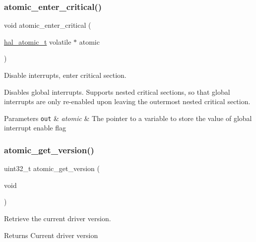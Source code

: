 \subsubsection{\texorpdfstring{atomic\+\_\+enter\+\_\+critical()}{atomic\_enter\_critical()}}
{\footnotesize\ttfamily void atomic\+\_\+enter\+\_\+critical (\begin{DoxyParamCaption}\item[{\hyperlink{group__doc__driver__hal__helper__atomic_ga6b3a0c9eea25111ac1877e0302e2fe1c}{hal\+\_\+atomic\+\_\+t} volatile $\ast$}]{atomic }\end{DoxyParamCaption})}



Disable interrupts, enter critical section. 

Disables global interrupts. Supports nested critical sections, so that global interrupts are only re-\/enabled upon leaving the outermost nested critical section.


\begin{DoxyParams}[1]{Parameters}
\mbox{\tt out}  & {\em atomic} & The pointer to a variable to store the value of global interrupt enable flag \\
\hline
\end{DoxyParams}
\mbox{\label{group__doc__driver__hal__helper__atomic_ga75fe13100e2799eb24a80123bc8c3787}} 
\subsubsection{\texorpdfstring{atomic\+\_\+get\+\_\+version()}{atomic\_get\_version()}}
{\footnotesize\ttfamily uint32\+\_\+t atomic\+\_\+get\+\_\+version (\begin{DoxyParamCaption}\item[{void}]{ }\end{DoxyParamCaption})}



Retrieve the current driver version. 

\begin{DoxyReturn}{Returns}
Current driver version 
\end{DoxyReturn}
\mbox{\label{group__doc__driver__hal__helper__atomic_gaef0ccaa2438aca5ea074b36252d65990}} 
